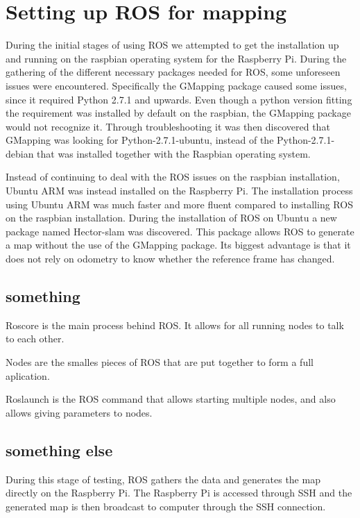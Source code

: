 \clearpage
\section{Setting up ROS for mapping}

During the initial stages of using ROS we attempted to get the installation up and running on the raspbian operating system for the Raspberry Pi. During the gathering of the different necessary packages needed for ROS, some unforeseen issues were encountered. Specifically the GMapping package caused some issues, since it required Python 2.7.1 and upwards. Even though a python version fitting the requirement was installed by default on the raspbian, the GMapping package would not recognize it. Through troubleshooting it was then discovered that GMapping was looking for Python-2.7.1-ubuntu, instead of the Python-2.7.1-debian that was installed together with the Raspbian operating system.

Instead of continuing to deal with the ROS issues on the raspbian installation, Ubuntu ARM was instead installed on the Raspberry Pi.
The installation process using Ubuntu ARM was much faster and more fluent compared to installing ROS on the raspbian installation. During the installation of ROS on Ubuntu a new package named Hector-slam was discovered. 
This package allows ROS to generate a map without the use of the GMapping package. Its biggest advantage is that it does not rely on odometry to know whether the reference frame has changed.

\subsection{something}
Roscore is the main process behind ROS. It allows for all running nodes to talk to each other.

Nodes are the smalles pieces of ROS that are put together to form a full aplication.

Roslaunch is the ROS command that allows starting multiple nodes, and also allows giving parameters to nodes.

\subsection{something else}
During this stage of testing, ROS gathers the data and generates the map directly on the Raspberry Pi. The Raspberry Pi is accessed through SSH and the generated map is then broadcast to computer through the SSH connection.

